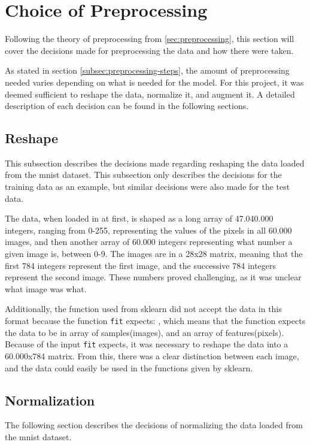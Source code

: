 \section{Choice of Preprocessing}
Following the theory of preprocessing from \ref{sec:preprocessing}, this section will cover the decisions made for preprocessing the data and how there were taken.

As stated in section \ref{subsec:preprocessing-steps}, the amount of preprocessing needed varies depending on what is needed for the model. For this project, it was deemed sufficient to reshape the data, normalize it, and augment it. A detailed description of each decision can be found in the following sections.

\subsection{Reshape}
This subsection describes the decisions made regarding reshaping the data loaded from the \gls{mnist} dataset. This subsection only describes the decisions for the training data as an example, but similar decisions were also made for the test data.

The data, when loaded in at first, is shaped as a long array of 47.040.000 integers, ranging from 0-255, representing the values of the pixels in all 60.000 images, and then another array of 60.000 integers representing what number a given image is, between 0-9. The images are in a 28x28 matrix, meaning that the first 784 integers represent the first image, and the successive 784 integers represent the second image. These numbers proved challenging, as it was unclear what image was what.

Additionally, the function used from \gls{sklearn} did not accept the data in this format because the function \texttt{fit} expects: , which means that the function expects the data to be in array of samples(images), and an array of features(pixels). Because of the input \texttt{fit} expects, it was necessary to reshape the data into a 60.000x784 matrix. From this, there was a clear distinction between each image, and the data could easily be used in the functions given by \gls{sklearn}.

\subsection{Normalization}
The following section describes the decisions of normalizing the data loaded from the \gls{mnist} dataset.

